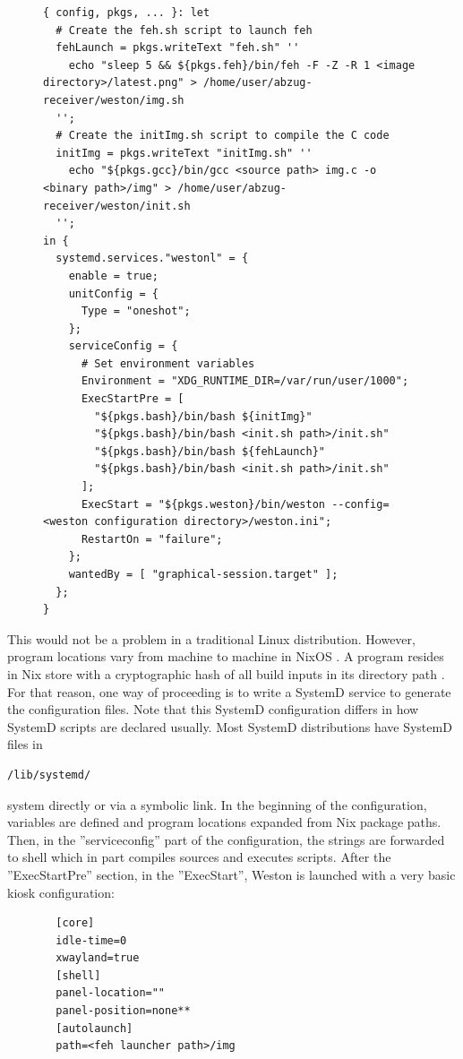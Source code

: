 \begin{figure}[H]
\begin{lstlisting} 
{ config, pkgs, ... }: let
  # Create the feh.sh script to launch feh
  fehLaunch = pkgs.writeText "feh.sh" ''
    echo "sleep 5 && ${pkgs.feh}/bin/feh -F -Z -R 1 <image directory>/latest.png" > /home/user/abzug-receiver/weston/img.sh
  '';
  # Create the initImg.sh script to compile the C code
  initImg = pkgs.writeText "initImg.sh" ''
    echo "${pkgs.gcc}/bin/gcc <source path> img.c -o <binary path>/img" > /home/user/abzug-receiver/weston/init.sh
  '';
in {
  systemd.services."westonl" = {
    enable = true;
    unitConfig = {
      Type = "oneshot";
    };
    serviceConfig = {
      # Set environment variables
      Environment = "XDG_RUNTIME_DIR=/var/run/user/1000";
      ExecStartPre = [
        "${pkgs.bash}/bin/bash ${initImg}"
        "${pkgs.bash}/bin/bash <init.sh path>/init.sh"
        "${pkgs.bash}/bin/bash ${fehLaunch}"
        "${pkgs.bash}/bin/bash <init.sh path>/init.sh"
      ];
      ExecStart = "${pkgs.weston}/bin/weston --config=<weston configuration directory>/weston.ini";
      RestartOn = "failure";
    };
    wantedBy = [ "graphical-session.target" ];
  };
}
\end{lstlisting}
\label{systemd1}
\end{figure}

This would not be a problem in a traditional Linux distribution. However, program locations vary from machine to machine in NixOS \cite{dolstra2010nixos}. A program resides in Nix store with a
cryptographic hash of all build inputs in its directory
path \cite{dolstra2010nixos}. For that reason, one way of proceeding
is to write a SystemD service to generate the configuration
files. Note that this SystemD configuration differs in how SystemD
scripts are declared usually. Most SystemD distributions have SystemD
files in
\begin{lstlisting}
/lib/systemd/
\end{lstlisting}
system directly or via a symbolic link. In the beginning of the configuration, variables are defined and
program locations expanded from Nix package paths. Then, in the
''serviceconfig'' part of the configuration, the strings are forwarded
to shell which in part compiles sources and executes scripts. After
the ''ExecStartPre'' section, in the ''ExecStart'', Weston is launched
with a very basic kiosk configuration:

\begin{figure}[H]
\begin{lstlisting} 
  [core]
  idle-time=0
  xwayland=true
  [shell]
  panel-location=""
  panel-position=none**
  [autolaunch]
  path=<feh launcher path>/img
\end{lstlisting}
\label{westonconf}
\end{figure}

